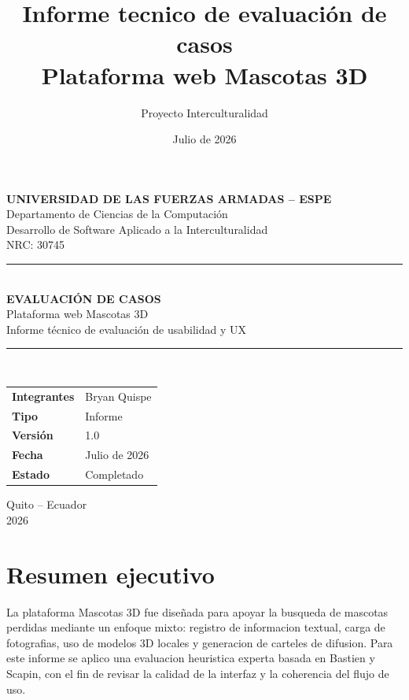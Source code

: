 \documentclass[12pt,a4paper]{article}
\title{\textbf{Informe tecnico de evaluaci\'on de casos}\\[0.3em]
\large Plataforma web Mascotas 3D}
\author{Proyecto Interculturalidad}
\date{Julio de 2026}
\begin{document}
\begin{titlepage}
\centering
\vspace*{0.8cm}

\vspace{0.8cm}
{\Large\bfseries UNIVERSIDAD DE LAS FUERZAS ARMADAS -- ESPE\\[0.15cm]}
{\large Departamento de Ciencias de la Computaci\'on\\[0.25cm]}
{\normalsize Desarrollo de Software Aplicado a la Interculturalidad\\[0.15cm]}
{\normalsize NRC: 30745\\[1.0cm]}

\rule{0.88\textwidth}{0.8pt}\\[0.7cm]

{\Huge\bfseries EVALUACI\'ON DE CASOS\\[0.3cm]}
{\Large Plataforma web Mascotas 3D\\[0.4cm]}
{\large Informe t\'ecnico de evaluaci\'on de usabilidad y UX\\[0.9cm]}

\rule{0.88\textwidth}{0.8pt}\\[1.3cm]

\begin{tabularx}{0.9\textwidth}{@{}>{\bfseries}p{4.2cm}Y@{}}
Integrantes & Bryan Quispe \\
Tipo & Informe \\
Versi\'on & 1.0 \\
Fecha & Julio de 2026 \\
Estado & Completado \\
\end{tabularx}

\vfill
{\large Quito -- Ecuador\\[0.2cm]}
{\large 2026}
\end{titlepage}

\tableofcontents
\newpage

\section{Resumen ejecutivo}
La plataforma Mascotas 3D fue dise\~nada para apoyar la busqueda de mascotas perdidas mediante un enfoque mixto: registro de informacion textual, carga de fotografias, uso de modelos 3D locales y generacion de carteles de difusion. Para este informe se aplico una evaluacion heuristica experta basada en Bastien y Scapin, con el fin de revisar la calidad de la interfaz y la coherencia del flujo de uso.
\end{document}
